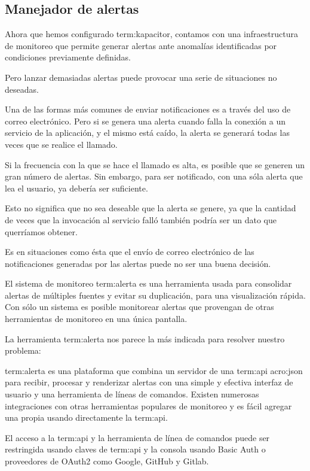 \subsection{Manejador de alertas}
\label{manejador-alertas}

Ahora que hemos configurado \gls{term:kapacitor}, contamos con una
infraestructura de monitoreo que permite generar alertas ante anomalías
identificadas por condiciones previamente definidas.

Pero lanzar demasiadas alertas puede provocar una serie de situaciones no
deseadas.

Una de las formas más comunes de enviar notificaciones es a través del uso de
correo electrónico. Pero si se genera una alerta cuando falla la conexión a un
servicio de la aplicación, y el mismo está caído, la alerta se generará todas
las veces que se realice el llamado.

Si la frecuencia con la que se hace el llamado es alta, es posible que se
generen un gran número de alertas. Sin embargo, para ser notificado, con una
sóla alerta que lea el usuario, ya debería ser suficiente.

Esto no significa que no sea deseable que la alerta se genere, ya que la
cantidad de veces que la invocación al servicio falló también podría ser un
dato que querríamos obtener.

Es en situaciones como ésta que el envío de correo electrónico de las
notificaciones generadas por las alertas puede no ser una buena decisión.

El sistema de monitoreo \gls{term:alerta} es una herramienta usada para
consolidar alertas de múltiples fuentes y evitar su duplicación, para una
visualización rápida. Con sólo un sistema es posible monitorear alertas que
provengan de otras herramientas de monitoreo en una única pantalla.

La herramienta \gls{term:alerta} nos parece la más indicada para resolver
nuestro problema:

\gls{term:alerta} es una plataforma que combina un servidor de una
\gls{term:api} \gls{acro:json} para recibir, procesar y renderizar alertas con
una simple y efectiva interfaz de usuario  y una herramienta de
líneas de comandos. Existen numerosas integraciones con otras herramientas
populares de monitoreo y es fácil agregar una propia usando directamente la
\gls{term:api}.

El acceso a la \gls{term:api} y la herramienta de línea de comandos puede ser
restringida usando claves de \gls{term:api} y la consola usando Basic Auth o
proveedores de OAuth2 como Google, GitHub y Gitlab.

